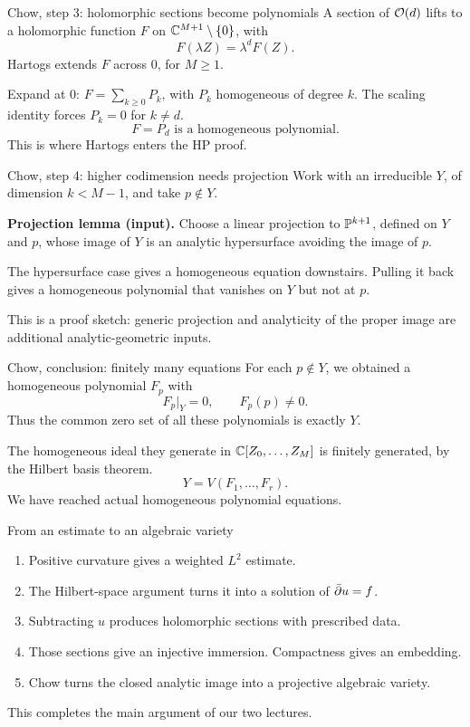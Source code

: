 \begin{frame}{Chow, step 3: holomorphic sections become polynomials}
A section of \(\mathcal O(d)\) lifts to a holomorphic function \(F\) on \(\mathbb C^{M+1}\setminus\{0\}\), with
\[
F(\lambda Z)=\lambda^dF(Z).
\]
Hartogs extends \(F\) across \(0\), for \(M\ge1\).
\par\medskip
Expand at \(0\): \(F=\sum_{k\ge0}P_k\), with \(P_k\) homogeneous of degree \(k\).
The scaling identity forces \(P_k=0\) for \(k\ne d\).
\[
\boxed{F=P_d\text{ is a homogeneous polynomial}.}
\]
This is where Hartogs enters the HP proof.
\end{frame}

\begin{frame}{Chow, step 4: higher codimension needs projection}
Work with an irreducible \(Y\), of dimension \(k<M-1\), and take \(p\notin Y\).
\par\medskip
\textbf{Projection lemma (input).} Choose a linear projection to \(\mathbb P^{k+1}\), defined on \(Y\) and \(p\), whose image of \(Y\) is an analytic hypersurface avoiding the image of \(p\).
\par\medskip
The hypersurface case gives a homogeneous equation downstairs. Pulling it back gives a homogeneous polynomial that vanishes on \(Y\) but not at \(p\).
\par\medskip
This is a proof sketch: generic projection and analyticity of the proper image are additional analytic-geometric inputs.
\end{frame}

\begin{frame}{Chow, conclusion: finitely many equations}
For each \(p\notin Y\), we obtained a homogeneous polynomial \(F_p\) with
\[
F_p|_Y=0,\qquad F_p(p)\ne0.
\]
Thus the common zero set of all these polynomials is exactly \(Y\).
\par\medskip
The homogeneous ideal they generate in \(\mathbb C[Z_0,\ldots,Z_M]\) is finitely generated, by the Hilbert basis theorem.
\[
\boxed{Y=V(F_1,\ldots,F_r).}
\]
We have reached actual homogeneous polynomial equations.
\end{frame}

\begin{frame}{From an estimate to an algebraic variety}
\begin{enumerate}
\setlength{\itemsep}{12pt}
\item Positive curvature gives a weighted \(L^2\) estimate.
\item The Hilbert-space argument turns it into a solution of \(\bar\partial u=f\).
\item Subtracting \(u\) produces holomorphic sections with prescribed data.
\item Those sections give an injective immersion. Compactness gives an embedding.
\item Chow turns the closed analytic image into a projective algebraic variety.
\end{enumerate}
\par\medskip
This completes the main argument of our two lectures.
\end{frame}


